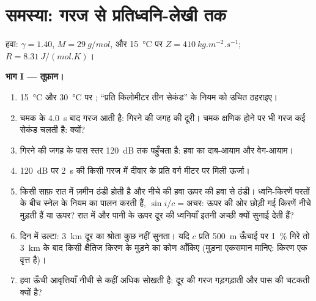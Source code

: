 \section{समस्या: गरज से प्रतिध्वनि-लेखी तक}

\begin{problem}
\label{pb:b2:sound-waves:1}

हवा: $\gamma = 1.40$, $M = \qty{29}{g/mol}$, और \qty{15}{\degreeCelsius} पर
$Z = \qty{410}{kg.m^{-2}.s^{-1}}$; $R = \qty{8.31}{J/(mol.K)}$।

\medskip
\noindent\textbf{भाग I --- तूफ़ान।}
\begin{enumerate}
  \item \qty{15}{\degreeCelsius} और \qty{30}{\degreeCelsius} पर ;
        ``प्रति किलोमीटर तीन सेकंड'' के नियम को उचित ठहराइए।
  \item चमक के \qty{4.0}{s} बाद गरज आती है: गिरने की जगह की
        दूरी। चमक क्षणिक होने पर भी गरज कई सेकंड चलती है:
        क्यों?
  \item गिरने की जगह के पास स्तर \qty{120}{dB} तक पहुँचता है: हवा का दाब-आयाम
        और वेग-आयाम।
  \item \qty{120}{dB} पर \qty{2}{s} की किसी गरज में दीवार के प्रति वर्ग मीटर पर
        मिली ऊर्जा।
  \item किसी साफ़ रात में ज़मीन ठंडी होती है और नीचे की हवा ऊपर की
        हवा से ठंडी। ध्वनि-किरणें परतों के बीच स्नेल के नियम का पालन करती हैं,
        $\sin i/c = \text{अचर}$: ऊपर की ओर छोड़ी गई किरणें नीचे मुड़ती हैं या ऊपर?
        रात में और पानी के ऊपर दूर की ध्वनियाँ इतनी अच्छी क्यों सुनाई देती हैं?
  \item दिन में उल्टा: \qty{3}{km} दूर का श्रोता कुछ नहीं सुनता।
        यदि $c$ प्रति \qty{500}{m} ऊँचाई पर \qty{1}{\%} गिरे तो \qty{3}{km} के बाद
        किसी क्षैतिज किरण के मुड़ने का कोण आँकिए
        (मुड़ना एकसमान मानिए: किरण एक वृत्त है)।

  \item हवा ऊँची आवृत्तियाँ नीची से कहीं अधिक सोखती है: दूर की गरज
        गड़गड़ाती और पास की चटकती क्यों है?
\end{enumerate}


\end{problem}

